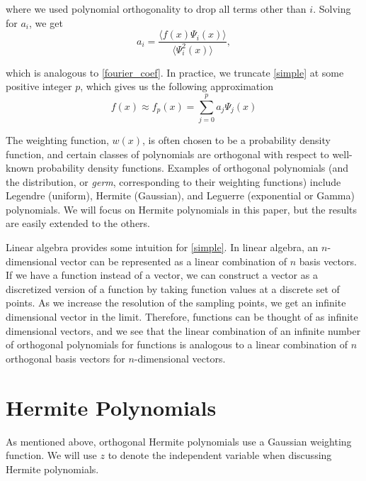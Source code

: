 \documentclass[11pt]{article}
\numberwithin{equation}{section}
\begin{document}
where we used polynomial orthogonality to drop all terms other than $i$. Solving for $a_i$, we get
\begin{equation}
a_i = \frac{\langle f(x) \Psi_i(x) \rangle }{\langle \Psi_i^2(x) \rangle}, \label{pc_coef}
\end{equation}

which is analogous to \eqref{fourier_coef}. In practice, we truncate \eqref{simple} at some positive integer $p$, which gives us the following approximation
\begin{equation}
f(x) \approx f_p(x) = \sum_{j=0}^{p}  a_j \Psi_j(x) \label{pce_trunc}
\end{equation}

\qquad The weighting function, $w(x)$, is often chosen to be a probability density function, and certain classes of polynomials are orthogonal with respect to well-known probability density functions. Examples of orthogonal polynomials (and the distribution, or {\em germ}, corresponding to their weighting functions) include Legendre (uniform), Hermite (Gaussian), and Leguerre (exponential or Gamma) polynomials. We will focus on Hermite polynomials in this paper, but the results are easily extended to the others. 

\qquad  Linear algebra provides some intuition for \eqref{simple}. In linear algebra, an $n$-dimensional vector can be represented as a linear combination of $n$ basis vectors. If we have a function instead of a vector, we can construct a vector as a discretized version of a function by taking function values at a discrete set of points. As we increase the resolution of the sampling points, we get an infinite dimensional vector in the limit. Therefore, functions can be thought of as infinite dimensional vectors, and we see that the linear combination of an infinite number of orthogonal polynomials for functions is analogous to a linear combination of $n$ orthogonal basis vectors for $n$-dimensional vectors. 











\section{Hermite Polynomials}

As mentioned above, orthogonal Hermite polynomials use a Gaussian weighting function. We will use $z$ to denote the independent variable when discussing Hermite polynomials.
\end{document}
